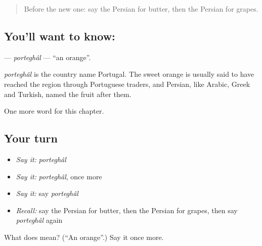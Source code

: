 \label{lesson:FA-C42-porteghal}



\begin{quote}
Before the new one: say the Persian for butter, then the Persian for grapes.
\end{quote}

\subsection*{You'll want to know: }
\textbf{} — \emph{porteghâl} — \textquotedblleft{}an orange\textquotedblright{}.

\begin{cousinweb}
\emph{porteghâl} is the country name Portugal. The sweet orange is usually said to have reached the region through Portuguese traders, and Persian, like Arabic, Greek and Turkish, named the fruit after them.
\end{cousinweb}

\begin{grammarlens}[title={What you've built}]
One more word for this chapter.
\end{grammarlens}

\subsection*{Your turn}
\begin{itemize}
\raggedright
  \item \emph{Say it:} \emph{porteghâl}
  \item \emph{Say it:} \emph{porteghâl}, once more
  \item \emph{Say it:} say \emph{porteghâl}
  \item \emph{Recall:} say the Persian for butter, then the Persian for grapes, then say \emph{porteghâl} again
\end{itemize}

\begin{tcolorbox}[breakable,colback=teal!4,colframe=teal!35!black,title={Before you move on}]
What does  mean? (\textquotedblleft{}An orange\textquotedblright{}.) Say it once more.
\end{tcolorbox}
